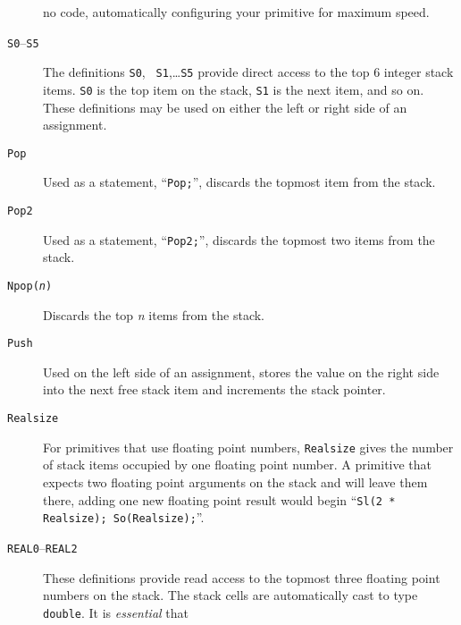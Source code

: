 \documentclass[twocolumn]{article}
\begin{document}
\begin{description}
                                no code, automatically configuring
                                your primitive for maximum speed.
\item[{\tt S0}--{\tt S5}]       The definitions {\tt S0}, {\tt
                                S1},\ldots {\tt S5} provide direct
                                access to the top 6 integer stack
                                items.  {\tt S0} is the top item on
                                the stack, {\tt S1} is the next item,
                                and so on.  These definitions may be
                                used on either the left or right
                                side of an assignment.
\item[{\tt Pop}]                Used as a statement, ``{\tt Pop;}'',
                                discards the topmost item from the
                                stack.
\item[{\tt Pop2}]               Used as a statement, ``{\tt Pop2;}'',
                                discards the topmost two items from the
                                stack.
\item[{\tt Npop({\em n})}]      Discards the top {\em n} items from
                                the stack.
\item[{\tt Push}]               Used on the left side of an
                                assignment, stores the value on the
                                right side into the next free stack
                                item and increments the stack pointer.
\item[{\tt Realsize}]           For primitives that use floating point
                                numbers, {\tt Realsize} gives the
                                number of stack items occupied by one
                                floating point number.  A primitive
                                that expects two floating point
                                arguments on the stack and will leave
                                them there, adding one new floating
                                point result would begin ``{\tt Sl(2 *
                                Realsize); So(Realsize);}''.
\item[{\tt REAL0}--{\tt REAL2}] These definitions provide read access
                                to the topmost three floating point
                                numbers on the stack.  The stack cells
                                are automatically cast to type {\tt
                                double}.  It is {\em essential} that

\end{description}
\end{document}

